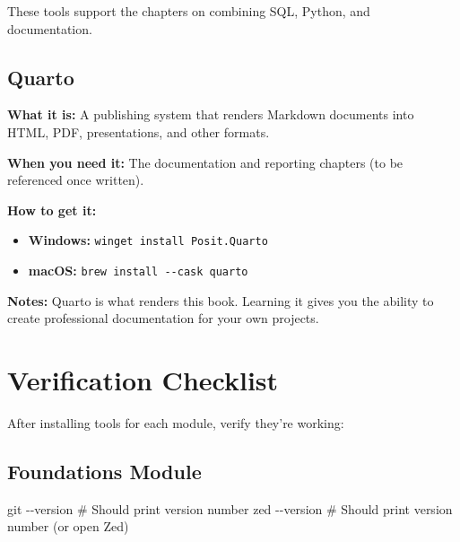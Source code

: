 \documentclass[
  letterpaper,
  DIV=11,
  numbers=noendperiod]{scrreprt}
\newenvironment{Shaded}{\begin{snugshade}}{\end{snugshade}}
\newcommand{\AttributeTok}[1]{\textcolor[rgb]{0.40,0.45,0.13}{#1}}
\newcommand{\CommentTok}[1]{\textcolor[rgb]{0.37,0.37,0.37}{#1}}
\newcommand{\ExtensionTok}[1]{\textcolor[rgb]{0.00,0.23,0.31}{#1}}
\newcommand{\FunctionTok}[1]{\textcolor[rgb]{0.28,0.35,0.67}{#1}}
\providecommand{\tightlist}{%
  \setlength{\itemsep}{0pt}\setlength{\parskip}{0pt}}
\begin{document}

These tools support the chapters on combining SQL, Python, and
documentation.

\subsection*{Quarto}\label{quarto}

\textbf{What it is:} A publishing system that renders Markdown documents
into HTML, PDF, presentations, and other formats.

\textbf{When you need it:} The documentation and reporting chapters (to
be referenced once written).

\textbf{How to get it:}

\begin{itemize}
\tightlist
\item
  \textbf{Windows:} \texttt{winget\ install\ Posit.Quarto}
\item
  \textbf{macOS:} \texttt{brew\ install\ -\/-cask\ quarto}
\end{itemize}

\textbf{Notes:} Quarto is what renders this book. Learning it gives you
the ability to create professional documentation for your own projects.

\section*{Verification Checklist}\label{verification-checklist}


After installing tools for each module, verify they're working:

\subsection*{Foundations Module}\label{foundations-module-1}

\begin{Shaded}
\begin{Highlighting}[]
\FunctionTok{git} \AttributeTok{{-}{-}version}        \CommentTok{\# Should print version number}
\ExtensionTok{zed} \AttributeTok{{-}{-}version}        \CommentTok{\# Should print version number (or open Zed)}
\end{Highlighting}
\end{Shaded}
\end{document}
